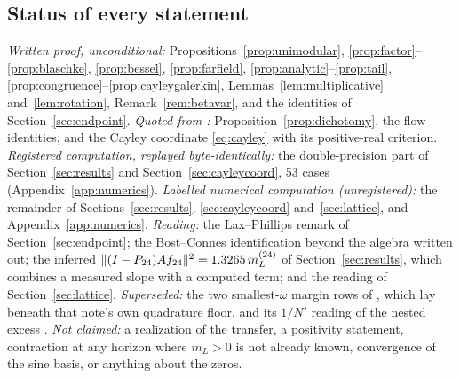 \subsection{Status of every statement}

\emph{Written proof, unconditional:} Propositions~\ref{prop:unimodular},
\ref{prop:factor}--\ref{prop:blaschke}, \ref{prop:bessel}, \ref{prop:farfield},
\ref{prop:analytic}--\ref{prop:tail}, \ref{prop:congruence}--\ref{prop:cayleygalerkin},
Lemmas~\ref{lem:multiplicative} and~\ref{lem:rotation}, Remark~\ref{rem:betavar},
and the identities of Section~\ref{sec:endpoint}.
\emph{Quoted from \cite{WilsonLines}:} Proposition~\ref{prop:dichotomy}, the
flow identities, and the Cayley coordinate \eqref{eq:cayley} with its
positive-real criterion. \emph{Registered computation, replayed
byte-identically:} the double-precision part of Section~\ref{sec:results} and
Section~\ref{sec:cayleycoord}, 53 cases (Appendix~\ref{app:numerics}).
\emph{Labelled numerical computation (unregistered):} the remainder of
Sections~\ref{sec:results}, \ref{sec:cayleycoord} and~\ref{sec:lattice}, and
Appendix~\ref{app:numerics}. \emph{Reading:} the Lax--Phillips remark of
Section~\ref{sec:endpoint}; the Bost--Connes identification beyond the algebra
written out; the inferred $\lVert (I-P_{24})Af_{24}\rVert^2=1.3265\,m_L^{(24)}$ of
Section~\ref{sec:results}, which combines a measured slope with a computed term;
and the reading of Section~\ref{sec:lattice}. \emph{Superseded:} the two
smallest-$\omega$ margin rows of \cite[Table~3.1]{ContractionNote}, which lay
beneath that note's own quadrature floor, and its $1/N'$ reading of the nested
excess \cite{RegisteredNote}. \emph{Not claimed:} a realization of the transfer,
a positivity statement, contraction at any horizon where $m_L>0$ is not already
known, convergence of the sine basis, or anything about the zeros.
